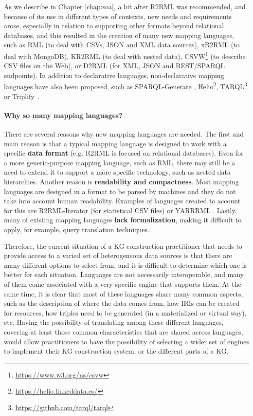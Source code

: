 As we describe in Chapter \ref{chap:soa}, a bit after R2RML was recommended, and because of its use in different types of contexts, new needs and requirements arose, especially in relation to supporting other formats beyond relational databases, and this resulted in the creation of many new mapping languages, such as RML \citep{dimou2014rml} (to deal with CSVs, JSON and XML data sources), xR2RML \citep{michel2015translation} (to deal with MongoDB), KR2RML \citep{slepicka2015kr2rml} (to deal with nested data), CSVW\footnote{\url{https://www.w3.org/ns/csvw}} (to describe CSV files on the Web), or D2RML \citep{chortaras2018d2rml} (for XML, JSON and REST/SPARQL endpoints). In addition to declarative languages, non-declarative mapping languages have also been proposed, such as SPARQL-Generate \citep{lefranccois2017sparql}, Helio\footnote{\url{https://helio.linkeddata.es/}},  TARQL\footnote{\url{https://github.com/tarql/tarql}} or Triplify~\citep{auer2009triplify}.

\noindent\paragraph{\textbf{Why so many mapping languages?}}
There are several reasons why new mapping languages are needed. The first and main reason is that a typical mapping language is designed to work with a specific \textbf{data format} (e.g. R2RML is focused on relational databases). Even for a more generic-purpose mapping language, such as RML, there may still be a need to extend it to support a more specific technology, such as nested data hierarchies. Another reason is \textbf{readability and compactness}. Most mapping languages are designed in a format to be parsed by machines and they do not take into account human readability. Examples of languages created to account for this are R2RML-Iterator (for statistical CSV files) \citep{chaves2018virtual} or YARRRML \citep{Heyvaert2018Declarative}. Lastly, many of existing mapping languages \textbf{lack formalization}, making it difficult to apply, for example, query translation techniques. 

Therefore, the current situation of a KG construction practitioner that needs to provide access to a varied set of heterogeneous data sources is that there are many different options to select from, and it is difficult to determine which one is better for each situation. Languages are not necessarily interoperable, and many of them come associated with a very specific engine that supports them. At the same time, it is clear that most of these languages share many common aspects, such as the description of where the data comes from, how IRIs can be created for resources, how triples need to be generated (in a materialized or virtual way), etc. Having the possibility of translating among these different languages, covering at least those common characteristics that are shared across languages, would allow practitioners to have the possibility of selecting a wider set of engines to implement their KG construction system, or the different parts of a KG.

